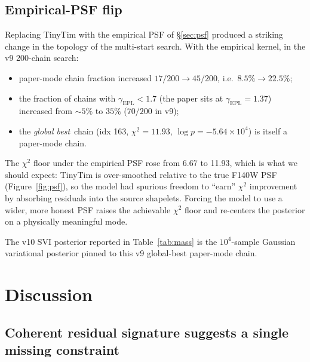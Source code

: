 \documentclass[11pt,letterpaper]{article}
\newcommand{\gammaEPL}{\ensuremath{\gamma_{\mathrm{EPL}}}}
\begin{document}
\subsection{Empirical-PSF flip}
\label{sec:psfflip}

Replacing TinyTim with the empirical PSF of \S\ref{sec:psf} produced
a striking change in the topology of the multi-start search. With the
empirical kernel, in the v9 200-chain search:
\begin{itemize}
\item paper-mode chain fraction increased $17/200 \to 45/200$, i.e.\
$8.5\%\to 22.5\%$;
\item the fraction of chains with $\gammaEPL<1.7$ (the paper sits at
$\gammaEPL=1.37$) increased from $\sim 5\%$ to $35\%$
($70/200$ in v9);
\item the {\it global best}\ chain (idx 163, $\chi^{2}=11.93$,
$\log p=-5.64\times10^{4}$) is itself a paper-mode chain.
\end{itemize}
The $\chi^{2}$ floor under the empirical PSF rose from 6.67 to 11.93,
which is what we should expect: TinyTim is over-smoothed relative to
the true F140W PSF (Figure~\ref{fig:psf}), so the model had spurious
freedom to ``earn'' $\chi^{2}$ improvement by absorbing residuals into
the source shapelets. Forcing the model to use a wider, more honest
PSF raises the achievable $\chi^{2}$ floor and re-centers the
posterior on a physically meaningful mode.

The v10 SVI posterior reported in Table~\ref{tab:mass} is the
$10^{4}$-sample Gaussian variational posterior pinned to this v9
global-best paper-mode chain.

\section{Discussion}
\label{sec:discussion}

\subsection{Coherent residual signature suggests a single missing
constraint}
\label{sec:single-constraint}
\end{document}
